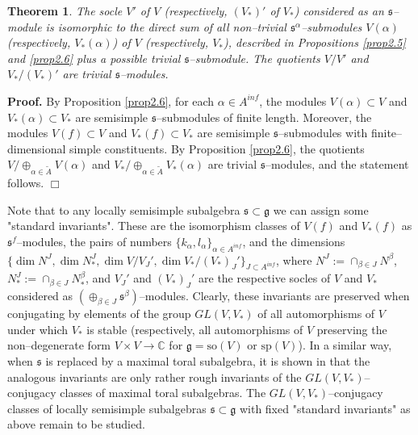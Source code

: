 \documentclass[oneside,leqno,12pt]{article}
\newcounter{theorem}
\newtheorem{theo}{Theorem}[section]
\newenvironment{proof}{ \noindent \textbf{Proof.}}{\hfill $\Box$}
\def\gg{\mathfrak{g}}
\def\gs{\mathfrak{s}}
\def\C{\mathbb{C}}
\renewcommand{\ss}{\mathfrak{s}}
\renewcommand{\gg}{\mathfrak{g}}
\newcommand{\refprop}[1]{Proposition \ref{#1}}
\renewcommand{\sp}{\mathrm{sp}}
\newcommand{\so}{\mathrm{so}}
\begin{document}
\begin{theo}
The socle $V'$ of $V$ (respectively, $(V_*)'$ of $V_*$) considered as an $\ss$--module 
 is isomorphic to the direct sum of all non--trivial $\ss^\alpha$--submodules $V(\alpha)$ (respectively, $V_*(\alpha)$) 
 of $V$ (respectively, $V_*$), described in 
 Propositions {\rm {\ref{prop2.5}}} and {\rm {\ref{prop2.6}}} plus a possible trivial $\ss$--submodule. The quotients $V/V'$ 
and $V_*/(V_*)'$ are trivial $\ss$--modules.  
\end{theo}
\begin{proof}
By \refprop{prop2.6}, for each $\alpha \in A^{inf}$, the modules $V(\alpha) \subset V$ and $V_*(\alpha) \subset V_*$ are semisimple $\ss$--submodules of finite length.
Moreover, the modules $V(f) \subset V$ and $V_*(f) \subset V_*$ are semisimple $\ss$--submodules with finite--dimensional simple constituents.
By \refprop{prop2.6}, the quotients  $V/\oplus_{\alpha \in \tilde{A}} V(\alpha)$ and  $V_*/\oplus_{\alpha \in \tilde{A}} V_*(\alpha)$
are trivial $\ss$--modules, and the statement follows. 
\end{proof}

Note that to any locally semisimple subalgebra $\gs \subset \gg$ we can assign some "standard invariants". These are 
the isomorphism classes of $V(f)$ and $V_*(f)$ as $\gs^f$--modules, the pairs of numbers 
$\{k_\alpha, l_\alpha\}_{\alpha \in A^{inf}}$, and the dimensions  $\{ \dim N^J, \dim N_*^J, \dim V/V_J', \dim V_*/(V_*)_J'\}_{J \subset A^{inf}}$, 
where $N^J := \cap_{\beta \in J} N^\beta$, $N_*^J := \cap_{\beta \in J} N_*^\beta$, and $V_J'$ and $(V_*)_J'$ are the respective socles of $V$ and $V_*$ considered as $(\oplus_{\beta \in J} \gs^\beta)$--modules.
Clearly, these invariants are preserved when conjugating by elements of the group $GL(V, V_*)$ of all automorphisms of $V$ under which $V_*$ is stable
(respectively, all automorphisms of $V$ preserving the non--degenerate form $V \times V \to \C$ for $\gg = \so(V)$ or $\sp(V)$). In a similar way, when
$\gs$ is replaced by a maximal toral subalgebra, it is shown in \cite{DPS} that the analogous invariants are only rather rough invariants of the $GL(V, V_*)$--conjugacy
classes of maximal toral subalgebras. The $GL(V, V_*)$--conjugacy classes of locally semisimple subalgebras $\gs \subset \gg$ with fixed "standard invariants" 
as above remain to be studied.
\end{document}
